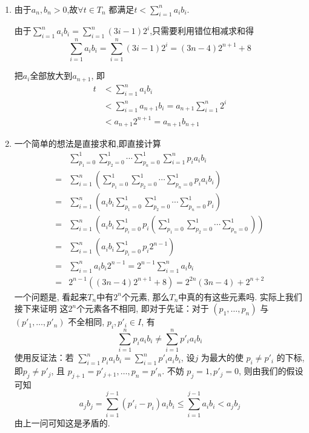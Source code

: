 \begin{jie}
    \,

    \begin{enumerate}[label=(\arabic*)]
        \item 由于\(a_n,b_n>0\),故\(\forall t\in T_n\)
        都满足\(t<\sum_{i=1}^na_ib_i\).
        \begin{way1}
            由于\(\sum_{i=1}^na_ib_i=\sum_{i=1}^n(3i-1)2^i   \),只需要利用错位相减求和得
            \[\sum_{i=1}^na_ib_i=\sum_{i=1}^n(3i-1)2^i=(3n-4)2^{n+1}+8\]
        \end{way1}
        \begin{way2}
            把\(a_i\)全部放大到\(a_{n+1}\), 即
            \begin{align*}
                t&<\sum_{i=1}^na_ib_i\\
                &<\sum_{i=1}^na_{n+1}b_i=a_{n+1}\sum_{i=1}^n 2^i\\
                &<a_{n+1}2^{n+1}=a_{n+1}b_{n+1}
            \end{align*}
        \end{way2}
        \item 一个简单的想法是直接求和,即直接计算
        \begin{align*}
            &\sum_{p_1=0}^{1}\sum_{p_2=0}^{1}\cdots\sum_{p_n=0}^{1}\sum_{i=1}^{n}p_ia_ib_i\\
            =&\sum_{i=1}^{n}\left(\sum_{p_1=0}^{1}\sum_{p_2=0}^{1}\cdots\sum_{p_n=0}^{1}p_ia_ib_i\right)\\
            =&\sum_{i=1}^{n}\left(a_ib_i\sum_{p_1=0}^{1}\sum_{p_2=0}^{1}\cdots\sum_{p_n=0}^{1}p_i\right)\\
            =&\sum_{i=1}^{n}\left(a_ib_i\sum_{p_i=0}^{1}p_i\left(\sum_{p_1=0}^{1}\sum_{p_2=0}^{1}\cdots\sum_{p_n=0}^{1}\right)\right)\\
            =&\sum_{i=1}^{n}\left(a_ib_i\sum_{p_i=0}^{1}p_i2^{n-1}\right)\\
            =&\sum_{i=1}^{n}a_ib_i2^{n-1}=2^{n-1}\sum_{i=1}^{n}a_ib_i\\
            =&2^{n-1}((3n-4)2^{n+1}+8)=2^{2n}(3n-4)+2^{n+2}
        \end{align*}
        一个问题是, 看起来\(T_n\)中有\(2^n\)个元素, 那么\(T_n\)中真的有这些元素吗. 实际上我们接下来证明
        这\(2^n\)个元素各不相同, 即对于先证：对于 $(p_1, \ldots, p_n)$ 与 $(p'_1, \ldots, p'_n)$ 不全相同, $p_i, p'_i \in I$, 有
\begin{equation}
\sum_{i=1}^{n} p_i a_i b_i \neq \sum_{i=1}^{n} p'_i a_i b_i
\end{equation}
使用反证法：若 $\sum_{i=1}^{n} p_i a_i b_i = \sum_{i=1}^{n} p'_i a_i b_i$,
设$j$ 为最大的使 $p_i \neq p'_i$ 的下标, 即$p_j \neq p'_j$, 且 $p_{j+1} = p'_{j+1}, \ldots, p_n = p'_n$. 
不妨 $p_j = 1, p'_j = 0$, 则由我们的假设可知
\[
a_j b_j = \sum_{i=1}^{j-1} (p'_i - p_i) a_i b_i \leq \sum_{i=1}^{j-1} a_i b_i < a_j b_j
\]由上一问可知这是矛盾的. 

        
    \end{enumerate}
\end{jie}
\clearpage

